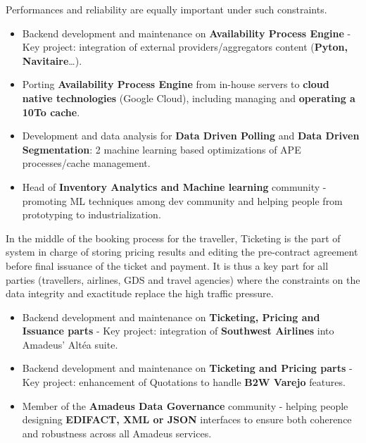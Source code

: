 \documentclass[10pt, a4paper, ragged2e]{altacv}
\begin{document}
		\medskip
		Performances and reliability are equally important under such constraints.

		\medskip
		\begin{itemize}
			\item Backend development and maintenance on \textbf{Availability Process Engine} - Key project: integration of external providers/aggregators content (\textbf{Pyton, Navitaire}\ldots).
			\item Porting \textbf{Availability Process Engine} from in-house servers to \textbf{cloud native technologies} (Google Cloud), including managing and \textbf{operating a 10To cache}.
			\item Development and data analysis for \textbf{Data Driven Polling} and \textbf{Data Driven Segmentation}: 2 machine learning based optimizations of APE processes/cache management.
			\item Head of \textbf{Inventory Analytics and Machine learning} community - promoting ML techniques among dev community and helping people from prototyping to industrialization.
		\end{itemize}
	\divider


		In the middle of the booking process for the traveller, Ticketing is the part of system in charge of storing pricing results and editing the pre-contract agreement before final issuance of the ticket and payment. It is thus a key part for all parties (travellers, airlines, GDS and travel agencies) where the constraints on the data integrity and exactitude replace the high traffic pressure.

		\medskip
		\begin{itemize}
			\item Backend development and maintenance on \textbf{Ticketing, Pricing and Issuance parts} - Key project: integration of \textbf{Southwest Airlines} into Amadeus' Altéa suite.
			\item Backend development and maintenance on \textbf{Ticketing and Pricing parts} - Key project: enhancement of Quotations to handle \textbf{B2W Varejo} features.
			\item Member of the \textbf{Amadeus Data Governance} community - helping people designing \textbf{EDIFACT, XML or JSON} interfaces to ensure both coherence and robustness across all Amadeus services.
		\end{itemize}
	\divider
\end{document}
